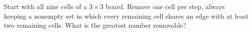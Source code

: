 Start with all nine cells of a $3\times3$ board. Remove one cell per step, always keeping a nonempty set in which every remaining cell shares an edge with at least two remaining cells. What is the greatest number removable?
